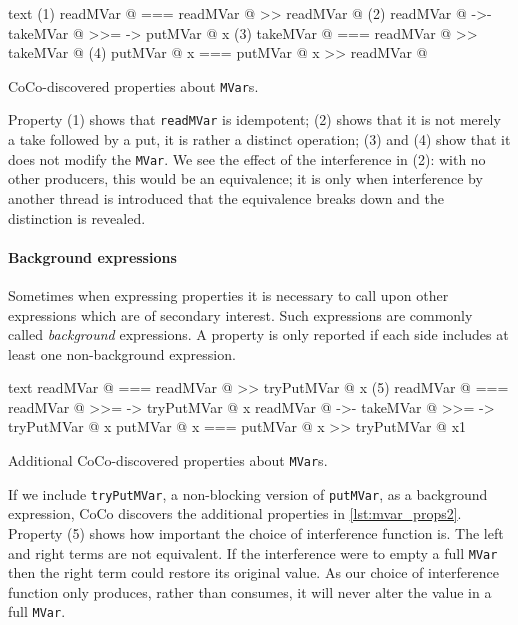 \begin{listing}
\centering
\begin{cminted}{text}
(1)   readMVar @  ===  readMVar @ >> readMVar @
(2)   readMVar @  ->-  takeMVar @ >>= \x -> putMVar @ x
(3)   takeMVar @  ===  readMVar @ >> takeMVar @
(4)  putMVar @ x  ===  putMVar @ x >> readMVar @
\end{cminted}
\caption{CoCo-discovered properties about \texttt{MVar}s.}\label{lst:mvar_props1}
\end{listing}

Property (1) shows that \verb|readMVar| is idempotent; (2) shows that
it is not merely a take followed by a put, it is rather a distinct
operation; (3) and (4) show that it does not modify the \verb|MVar|.
We see the effect of the interference in (2): with no other producers,
this would be an equivalence; it is only when interference by another
thread is introduced that the equivalence breaks down and the
distinction is revealed.

\paragraph{Background expressions}
Sometimes when expressing properties it is necessary to call upon
other expressions which are of secondary interest.  Such expressions
are commonly called \emph{background} expressions.  A property is only
reported if each side includes at least one non-background expression.

\begin{listing}
\centering
\begin{cminted}{text}
      readMVar @  ===  readMVar @ >> tryPutMVar @ x
(5)   readMVar @  ===  readMVar @ >>= \x -> tryPutMVar @ x
      readMVar @  ->-  takeMVar @ >>= \x -> tryPutMVar @ x
     putMVar @ x  ===  putMVar @ x >> tryPutMVar @ x1
\end{cminted}
\caption{Additional CoCo-discovered properties about \texttt{MVar}s.}\label{lst:mvar_props2}
\end{listing}

If we include \verb|tryPutMVar|, a non-blocking version of
\verb|putMVar|, as a background expression, CoCo discovers the
additional properties in \cref{lst:mvar_props2}.  Property (5) shows
how important the choice of interference function is.  The left and
right terms are not equivalent.  If the interference were to empty a
full \verb|MVar| then the right term could restore its original value.
As our choice of interference function only produces, rather than
consumes, it will never alter the value in a full \verb|MVar|.

